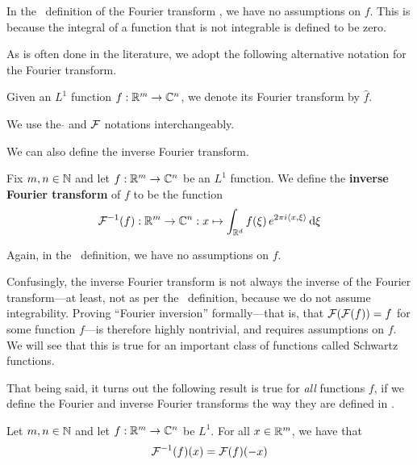 In the \mathlib\ definition of the Fourier transform , we have no assumptions on $f$. This is because the integral of a function that is not integrable is defined to be zero.

As is often done in the literature, we adopt the following alternative notation for the Fourier transform.

\begin{boxnotation}
    Given an $L^1$ function $f : \mathbb{R}^m \to \mathbb{C}^n$, we denote its Fourier transform by $\hat{f}$.
\end{boxnotation}

We use the $\hat{}$ and $\mathcal{F}$ notations interchangeably.

We can also define the inverse Fourier transform.

\begin{boxdefinition}
    Fix $m, n \in \mathbb{N}$ and let $f : \mathbb{R}^m \to \mathbb{C}^n$ be an $L^1$ function. We define the \textbf{inverse Fourier transform} of $f$ to be the function
    \begin{align*}
         \mathcal{F}^{-1}(f) : \mathbb{R}^m \to \mathbb{C}^n : x \mapsto \int_{\mathbb{R}^d} f\!\left( \xi \right) e^{2 \pi i \left\langle x, \xi \right\rangle} \operatorname{d}\!{\xi}
    \end{align*}
\end{boxdefinition}

Again, in the \mathlib\ definition, we have no assumptions on $f$.

Confusingly, the inverse Fourier transform is not always the inverse of the Fourier transform---at least, not as per the \mathlib\ definition, because we do not assume integrability. Proving ``Fourier inversion'' formally---that is, that $\mathcal{F}\!\left( \mathcal{F}\!\left( f \right) \right) = f$ for some function $f$---is therefore highly nontrivial, and requires assumptions on $f$. We will see that this is true for an important class of functions called Schwartz functions.

That being said, it turns out the following result is true for \textit{all} functions $f$, if we define the Fourier and inverse Fourier transforms the way they are defined in \mathlib.

\begin{boxlemma}\label{Ch2:Lemma:Fourier_Inverse_Fourier_Neg}
    Let $m, n \in \mathbb{N}$ and let $f : \mathbb{R}^m \to \mathbb{C}^n$ be $L^1$. For all $x \in \mathbb{R}^m$, we have that
    \begin{align*}
        \mathcal{F}^{-1}\!\left( f \right)\!\left( x \right) = \mathcal{F}\!\left( f \right)\!\left( -x \right)
    \end{align*}
\end{boxlemma}

